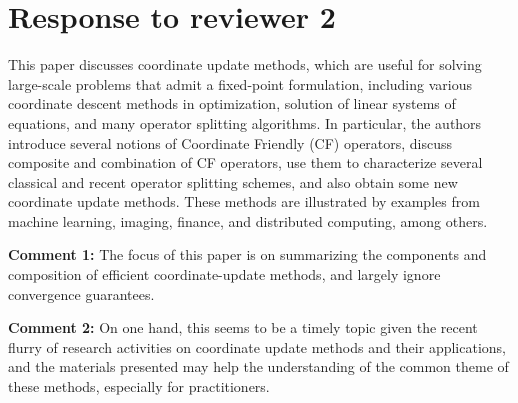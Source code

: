 \documentclass[amsa]{ipart}
\begin{document}
\section{Response to reviewer 2}
This paper discusses coordinate update methods, which are useful for solving
large-scale problems that admit a fixed-point formulation, including various
coordinate descent methods in optimization, solution of linear systems of
equations, and many operator splitting algorithms. In particular, the authors
introduce several notions of Coordinate Friendly (CF) operators, discuss
composite and combination of CF operators, use them to characterize several
classical and recent operator splitting schemes, and also obtain some new
coordinate update methods. These methods are illustrated by examples from
machine learning, imaging, finance, and distributed computing, among others.

\textbf{Comment 1:} The focus of this paper is on summarizing the components and composition of
efficient coordinate-update methods, and largely ignore convergence guarantees.


\textbf{Comment 2:} On one hand, this seems to be a timely topic given the recent flurry of
research activities on coordinate update methods and their applications, and
the materials presented may help the understanding of the common theme of
these methods, especially for practitioners. 

\end{document}
